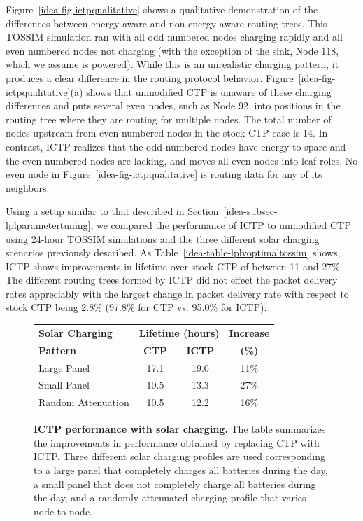 Figure~\ref{idea-fig-ictpqualitative} shows a qualitative demonstration of the
differences between energy-aware and non-energy-aware routing trees. This
TOSSIM simulation ran with all odd numbered nodes charging rapidly and all
even numbered nodes not charging (with the exception of the sink, Node 118,
which we assume is powered). While this is an unrealistic charging pattern,
it produces a clear difference in the routing protocol behavior.
Figure~\ref{idea-fig-ictpqualitative}(a) shows that unmodified CTP is unaware of
these charging differences and puts several even nodes, such as Node 92, into
positions in the routing tree where they are routing for multiple nodes. The
total number of nodes upstream from even numbered nodes in the stock CTP case
is 14. In contrast, ICTP realizes that the odd-numbered nodes have energy to
spare and the even-numbered nodes are lacking, and moves all even nodes into
leaf roles. No even node in Figure~\ref{idea-fig-ictpqualitative} is routing data
for any of its neighbors.

Using a setup similar to that described in
Section~\ref{idea-subsec-lplparametertuning}, we compared the performance of ICTP
to unmodified CTP using 24-hour TOSSIM simulations and the three different
solar charging scenarios previously described. As
Table~\ref{idea-table-lplvoptimaltossim} shows, ICTP shows improvements in
lifetime over stock CTP of between 11 and 27\%. The different routing trees
formed by ICTP did not effect the packet delivery rates appreciably with the
largest change in packet delivery rate with respect to stock CTP being 2.8\%
(97.8\% for CTP vs. 95.0\% for ICTP).

\begin{figure}[t]
\label{idea-table-ictpvoptimaltossim}
\begin{center}
\begin{tabular}{|l|ccc|}
\hline
\textbf{Solar Charging} & \multicolumn{2}{c}{\textbf{Lifetime (hours)}} & \textbf{Increase} \\
\textbf{Pattern} & \textbf{CTP} & \textbf{ICTP} & \textbf{(\%)} \\ \hline
Large Panel & 17.1 & 19.0 & 11\% \\
Small Panel & 10.5 & 13.3 & 27\% \\
Random Attenuation & 10.5 & 12.2 & 16\% \\ \hline
\end{tabular}
\end{center}
\caption{\textbf{ICTP performance with solar charging.}
The table summarizes the improvements in performance obtained by replacing
CTP with ICTP. Three different solar charging profiles are used corresponding
to a large panel that completely charges all batteries during the day, a
small panel that does not completely charge all batteries during the day, and
a randomly attenuated charging profile that varies node-to-node.}
\end{figure}

